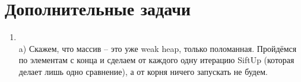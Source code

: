 \documentclass[12pt]{article}
\begin{document}
\section{Дополнительные задачи}

\begin{enumerate}
	\setlength{\parskip}{0pt} 
	\setlength{\itemsep}{0pt} 
	\item ~\\
	 a) Скажем, что массив -- это уже weak heap, только поломанная. Пройдёмся по элементам с конца и сделаем от каждого одну итерацию SiftUp (которая делает лишь одно сравнение), а от корня ничего запускать не будем. \\
\end{enumerate}
\end{document}
